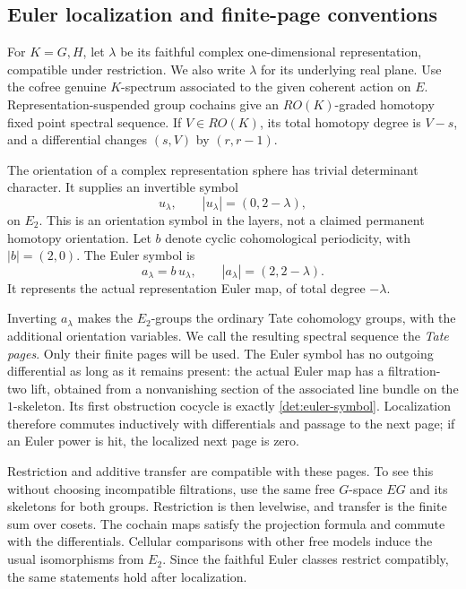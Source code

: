 \subsection{Euler localization and finite-page conventions}

For \(K=G,H\), let \(\lambda\) be its faithful complex
one-dimensional representation, compatible under restriction.
We also write \(\lambda\) for its underlying real plane.
Use the cofree genuine \(K\)-spectrum associated to the given
coherent action on \(E\).  Representation-suspended group
cochains give an \(RO(K)\)-graded homotopy fixed point spectral
sequence.  If \(V\in RO(K)\), its total homotopy degree is
\(V-s\), and a differential changes \((s,V)\) by
\((r,r-1)\).

The orientation of a complex representation sphere has trivial
determinant character.  It supplies an invertible symbol
\[
 u_\lambda,\qquad |u_\lambda|=(0,2-\lambda),
\]
on \(E_2\).  This is an orientation symbol in the layers,
not a claimed permanent homotopy orientation.
Let \(b\) denote cyclic cohomological periodicity, with
\(|b|=(2,0)\).  The Euler symbol is
\begin{equation}\label{det:euler-symbol}
 a_\lambda=b\,u_\lambda,\qquad
 |a_\lambda|=(2,2-\lambda).
\end{equation}
It represents the actual representation Euler map, of total
degree \(-\lambda\).

Inverting \(a_\lambda\) makes the \(E_2\)-groups the ordinary
Tate cohomology groups, with the additional orientation
variables.  We call the resulting spectral sequence the
\emph{Tate pages}.  Only their finite pages will be used.
The Euler symbol has no outgoing differential as long as it
remains present: the actual Euler map has a filtration-two
lift, obtained from a nonvanishing section of the associated
line bundle on the \(1\)-skeleton.  Its first obstruction
cocycle is exactly \eqref{det:euler-symbol}.
Localization therefore commutes inductively with differentials
and passage to the next page; if an Euler power is hit, the
localized next page is zero.

Restriction and additive transfer are compatible with these
pages.  To see this without choosing incompatible filtrations,
use the same free \(G\)-space \(EG\) and its skeletons for both
groups.  Restriction is then levelwise, and transfer is the
finite sum over cosets.  The cochain maps satisfy the projection
formula and commute with the differentials.  Cellular
comparisons with other free models induce the usual
isomorphisms from \(E_2\).  Since the faithful Euler classes
restrict compatibly, the same statements hold after
localization.

